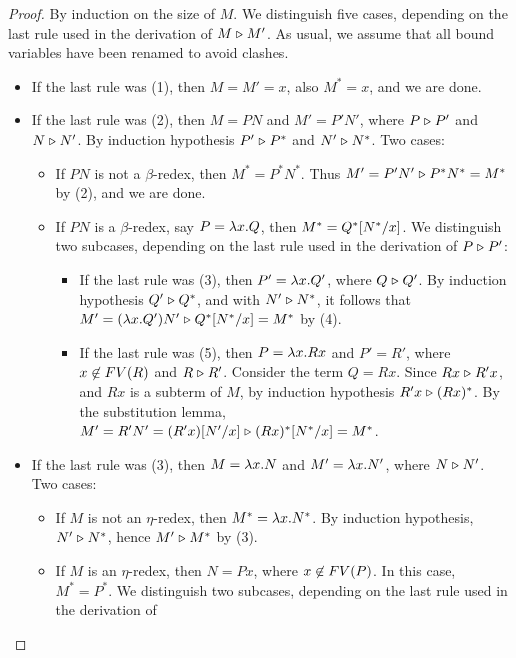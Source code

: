 \documentclass{article}
\begin{document}
\begin{proof}
  By induction on the size of $M$. We distinguish five cases,
  depending on the last rule used in the derivation of $M \mathrel{\triangleright} M'$.
  As usual, we assume that all bound variables have been renamed to
  avoid clashes.
  \begin{itemize}
  \item If the last rule was (1), then $M=M'=x$, also $M^*=x$, and we
    are done.
  \item If the last rule was (2), then $M=PN$ and $M'=P'N'$, where
    $P\mathrel{\triangleright} P'$ and $N\mathrel{\triangleright} N'$. By
    induction hypothesis $P'\mathrel{\triangleright} P^*$ and $N'\mathrel{\triangleright} N^*$. Two cases:
    \begin{itemize}
    \item If $PN$ is not a $\beta$-redex, then $M^*=P^*N^*$. Thus
      $M'=P'N'\mathrel{\triangleright} P^*N^*=M^*$ by (2), and we are done.
    \item If $PN$ is a $\beta$-redex, say $P=\lambda x.Q$, then
      $M^*=Q^*[N^*/x]$. We distinguish two subcases,
      depending on the last rule used in the derivation of $P\mathrel{\triangleright} P'$:
      \begin{itemize} 
      \item If the last rule was (3), then $P'=\lambda x.Q'$, where
        $Q\mathrel{\triangleright} Q'$.  By induction hypothesis $Q' \mathrel{\triangleright} Q^*$, and with
        $N' \mathrel{\triangleright} N^*$, it follows that $M' = (\lambda x.Q')N' \mathrel{\triangleright}
        Q^*[N^*/x] = M^*$ by (4).
      \item If the last rule was (5), then $P=\lambda x.Rx$ and $P'=R'$,
        where $x\not\in FV(R)$ and $R\mathrel{\triangleright} R'$. Consider the term
        $Q=Rx$.  Since $Rx \mathrel{\triangleright} R'x$, and $Rx$ is a subterm of $M$, by
        induction hypothesis $R'x \mathrel{\triangleright} (Rx)^*$. By the substitution
        lemma, $M' = R'N' = (R'x)[N'/x] \mathrel{\triangleright}
        (Rx)^*[N^*/x] = M^*$.
      \end{itemize}
    \end{itemize}
  \item If the last rule was (3), then $M = \lambda x.N$ and $M' = \lambda
    x.N'$, where $N\mathrel{\triangleright} N'$. Two cases:
    \begin{itemize}
    \item If $M$ is not an $\eta$-redex, then $M^*=\lambda x.N^*$. By
      induction hypothesis, $N'\mathrel{\triangleright} N^*$, hence $M'\mathrel{\triangleright} M^*$ by (3).
    \item If $M$ is an $\eta$-redex, then $N=Px$, where
      $x\not\in FV(P)$. In this case, $M^*=P^*$. We distinguish two
      subcases, depending on the last rule used in the derivation of

\end{itemize}
\end{itemize}
\end{proof}
\end{document}
